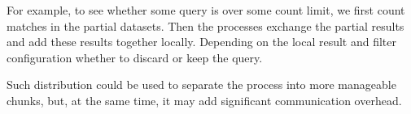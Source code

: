 \begin{figure}[H]
	\scalebox{0.8}{}
\end{figure}

\begin{exmp}
For example, to see whether some query is over some count limit, we first count matches in the partial datasets. Then the processes exchange the partial results and add these results together locally. Depending on the local result and filter configuration whether to discard or keep the query.
\end{exmp}

Such distribution could be used to separate the process into more manageable chunks, but, at the same time, it may add significant communication overhead.